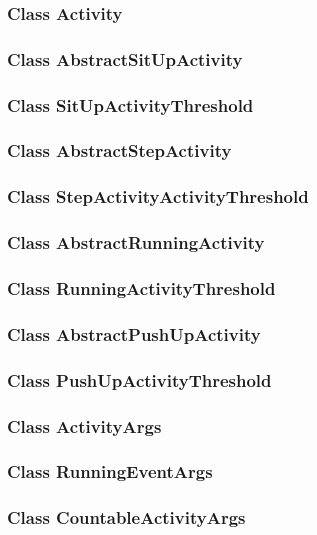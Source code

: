 \documentclass[a4paper,12pt]{article}
\begin{document}
	
	\subsubsection{Class Activity}
	
	\subsubsection{Class AbstractSitUpActivity}
	\subsubsection{Class SitUpActivityThreshold}
	
	\subsubsection{Class AbstractStepActivity}
	\subsubsection{Class StepActivityActivityThreshold}
	
	\subsubsection{Class AbstractRunningActivity}
	\subsubsection{Class RunningActivityThreshold}
	
	\subsubsection{Class AbstractPushUpActivity}
	\subsubsection{Class PushUpActivityThreshold}
	
	\subsubsection{Class ActivityArgs}
	\subsubsection{Class RunningEventArgs}
	
	\subsubsection{Class CountableActivityArgs}
\end{document}
